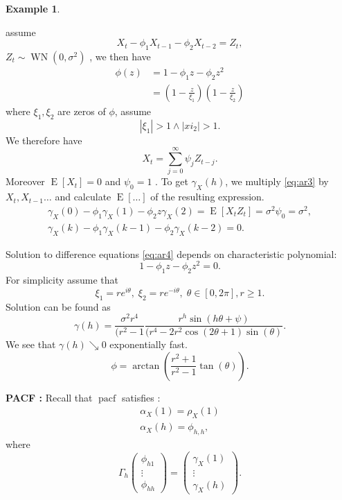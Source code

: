 \documentclass[12pt,a4paper, notitlepage]{book}
\theoremstyle{definition} %
\newtheorem{example}[definition]{Example}
\theoremstyle{plain} %
\DeclareMathOperator{\E}{E}
\DeclareMathOperator{\Pacf}{pacf}
\DeclareMathOperator{\Wn}{WN}
\begin{document}
\begin{example}
\begin{enumerate}[alph]
assume 
\[  X_t - \phi _1 X_{t-1} - \phi _2 X_{t-2} = Z_t  \label{eq:ar3} , \]
$  Z_t \sim \Wn(0, \sigma^2 ) $ , we then have
\begin{align*} \phi(z) & =  1 - \phi _1 z - \phi _2 z^2 \\
 & = \left( 1 - \frac{z}{ \xi _1} \right) \left( 1 - \frac{z}{\xi_2} \right)  
\end{align*}
where $ \xi _1 , \xi _2 $ are zeros of $ \phi $, assume
\[ | \xi _1| >1 \wedge  |xi _2 | > 1 . \]
We therefore have
\[ X_t = \sum _{j=0} ^{\infty} \psi _j Z_{t-j} . \]
Moreover $  \E [X_t] = 0 $ and $ \psi _0 = 1 $ . To get 
$ \gamma _X (h) $, we multiply \ref{eq:ar3} by $ X_t , X_{t-1} \ldots  $ and calculate $ \E[ \ldots ] $ of the resulting expression.
\begin{align*} \gamma _X (0) - \phi _1 \gamma _X (1) - \phi _2 z\gamma _X(2) = \E[X_t Z_t] = \sigma ^2 \psi _0  = \sigma ^2 , \\
\gamma _X(k) - \phi _1 \gamma _X(k-1) - \phi_2 \gamma_X(k-2) = 0 . \label{eq:ar4} \end{align*}

Solution to difference equations \ref{eq:ar4} depends on characteristic polynomial:
\[ 1 - \phi _1 z - \phi _2 z^2 = 0 . \]
For simplicity assume that 
\[ \xi _1 = r e^{i \theta} , \; \xi _2 = r e^{- i \theta } , \; \theta \in [0, 2 \pi ], r \geq 1 . \]
Solution can be found as 
\[ \gamma(h) = \frac{ \sigma ^2 r ^4}{(r^2 - 1}  \frac{r^h \sin(h \theta + \psi ) } { (r^4 - 2 r^2 \cos(2 \theta + 1) \sin(\theta) } . \]
We see that $ \gamma (h) \searrow 0 $ exponentially fast. 
 \[ \phi = \arctan\left( \frac{r^2 + 1}{r^2 -1} \tan(\theta) \right) . \]

\end{enumerate}
\end{example}



{\bf PACF :} Recall that $ \Pacf $ satisfies :
\begin{align*} 
\alpha _X(1) = \rho _X(1)  \\
\alpha _X(h) = \phi _{h,h} ,
\end{align*}
where 
\[ \Gamma _h \left( \begin{array}{c}  \phi _{h1} \\ \vdots \\ \phi _{hh} \end{array} \right) = \left( \begin{array}{c} \gamma _X(1) \\ 
\vdots \\ \gamma _X(h) \end{array} \right) . \]
\end{document}

